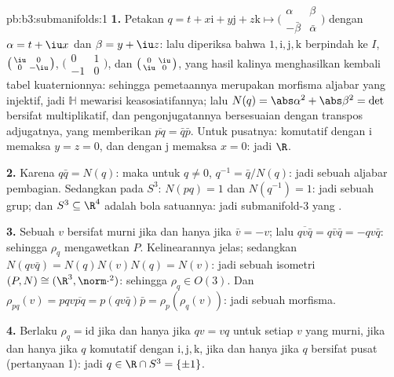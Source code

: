 \begin{solution}{pb:b3:submanifolds:1}
\textbf{1.} Petakan $q = t + x\mathrm i + y\mathrm j + z\mathrm k
\mapsto \bigl(\begin{smallmatrix}\alpha & \beta\\ -\bar\beta
& \bar\alpha\end{smallmatrix}\bigr)$ dengan $\alpha = t + \iu
x$ dan $\beta = y + \iu z$: lalu diperiksa bahwa $1, \mathrm i,
\mathrm j, \mathrm k$ berpindah ke $I$, $\bigl(\begin{smallmatrix}
\iu & 0\\ 0 & -\iu\end{smallmatrix}\bigr)$,
$\bigl(\begin{smallmatrix}0 & 1\\ -1 &
0\end{smallmatrix}\bigr)$, dan $\bigl(\begin{smallmatrix}0 &
\iu\\ \iu & 0\end{smallmatrix}\bigr)$, yang hasil kalinya
menghasilkan kembali tabel kuaternionnya: sehingga pemetaannya merupakan morfisma
aljabar yang injektif, jadi $\mathbb H$ mewarisi keasosiatifannya;
lalu $N(q) = \abs\alpha^2 + \abs\beta^2 = \det$ bersifat multiplikatif,
dan pengonjugatannya bersesuaian dengan transpos adjugatnya,
yang memberikan $\overline{pq} = \bar q\bar p$. Untuk pusatnya: komutatif
dengan $\mathrm i$ memaksa $y = z = 0$, dan dengan $\mathrm j$ memaksa
$x = 0$: jadi $\R$.

\textbf{2.} Karena $q\bar q = N(q)$: maka untuk $q \neq 0$, $q^{-1} = \bar
q/N(q)$: jadi sebuah aljabar pembagian. Sedangkan pada $S^3$: $N(pq) = 1$ dan
$N(q^{-1}) = 1$: jadi sebuah grup; dan $S^3 \subseteq \R^4$ adalah
bola satuannya: jadi submanifold-$3$ yang .

\textbf{3.} Sebuah $v$ bersifat murni jika dan hanya jika $\bar v = -v$; lalu
$\overline{qv\bar q} = q\bar v\bar q = -qv\bar q$: sehingga $\rho_q$
mengawetkan $P$. Kelinearannya jelas; sedangkan $N(qv\bar q) =
N(q)N(v)N(q) = N(v)$: jadi sebuah isometri $(P, N) \cong (\R^3,
\norm\cdot^2)$: sehingga $\rho_q \in O(3)$. Dan $\rho_{pq}(v) =
pqv\overline{pq} = p(qv\bar q)\bar p =
\rho_p(\rho_q(v))$: jadi sebuah morfisma.

\textbf{4.} Berlaku $\rho_q = \mathrm{id}$ jika dan hanya jika $qv = vq$ untuk setiap $v$
yang murni, jika dan hanya jika $q$ komutatif dengan $\mathrm i, \mathrm j, \mathrm k$,
jika dan hanya jika $q$ bersifat pusat (pertanyaan 1): jadi $q \in \R\cap S^3 =
\{\pm1\}$.


\end{solution}
